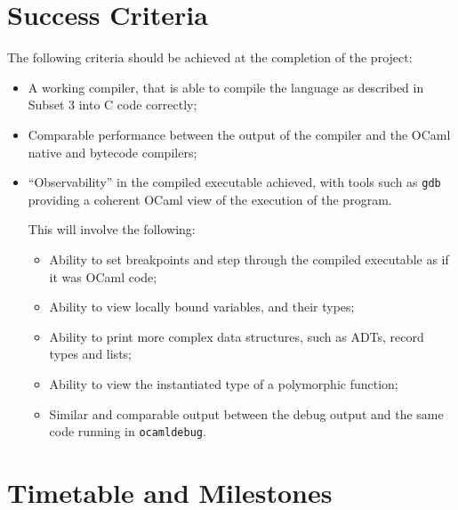 \section*{Success Criteria}

The following criteria should be achieved at the completion of the project:

\begin{itemize}

    \item A working compiler, that is able to compile the language as described
        in Subset 3 into C code correctly;

    \item Comparable performance between the output of the compiler and the
        OCaml native and bytecode compilers;

    \item ``Observability'' in the compiled executable achieved, with tools
        such as \texttt{gdb} providing a coherent OCaml view of the execution
        of the program.

        This will involve the following:

        \begin{itemize}

            \item Ability to set breakpoints and step through the compiled executable
                as if it was OCaml code;

            \item Ability to view locally bound variables, and their types;

            \item Ability to print more complex data structures, such as ADTs,
                record types and lists;

            \item Ability to view the instantiated type of a polymorphic
                function;

            \item Similar and comparable output between the debug output and
                the same code running in \texttt{ocamldebug}.

        \end{itemize}

\end{itemize}

\section*{Timetable and Milestones}

